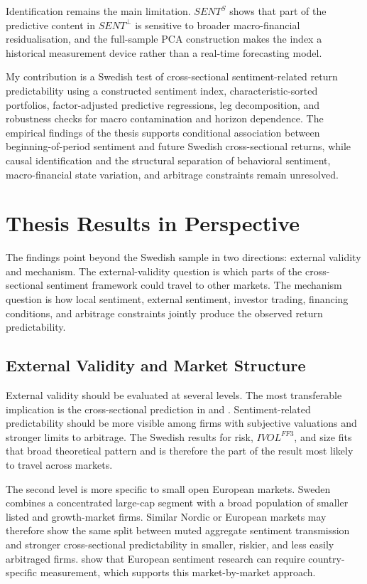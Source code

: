 \documentclass[11pt]{article}
\newcommand{\var}[1]{\ensuremath{#1}}
\begin{document}
Identification remains the main limitation. \var{SENT^{S}} shows that part of the predictive content in \var{SENT^{\perp}} is sensitive to broader macro-financial residualisation, and the full-sample PCA construction makes the index a historical measurement device rather than a real-time forecasting model. 

My contribution is a Swedish test of cross-sectional sentiment-related return predictability using a constructed sentiment index, characteristic-sorted portfolios, factor-adjusted predictive regressions, leg decomposition, and robustness checks for macro contamination and horizon dependence. The empirical findings of the thesis supports conditional association between beginning-of-period sentiment and future Swedish cross-sectional returns, while causal identification and the structural separation of behavioral sentiment, macro-financial state variation, and arbitrage constraints remain unresolved.

\section{Thesis Results in Perspective}
The findings point beyond the Swedish sample in two directions: external validity and mechanism. The external-validity question is which parts of the cross-sectional sentiment framework could travel to other markets. The mechanism question is how local sentiment, external sentiment, investor trading, financing conditions, and arbitrage constraints jointly produce the observed return predictability.

\subsection{External Validity and Market Structure}
External validity should be evaluated at several levels. The most transferable implication is the cross-sectional prediction in \citet{baker2006sentiment} and \citet{baker2007}. Sentiment-related predictability should be more visible among firms with subjective valuations and stronger limits to arbitrage. The Swedish results for risk, \var{IVOL^{FF3}}, and size fits that broad theoretical pattern and is therefore the part of the result most likely to travel across markets.

The second level is more specific to small open European markets. Sweden combines a concentrated large-cap segment with a broad population of smaller listed and growth-market firms. Similar Nordic or European markets may therefore show the same split between muted aggregate sentiment transmission and stronger cross-sectional predictability in smaller, riskier, and less easily arbitraged firms. \citet{finter2012german} show that European sentiment research can require country-specific measurement, which supports this market-by-market approach.
\end{document}
